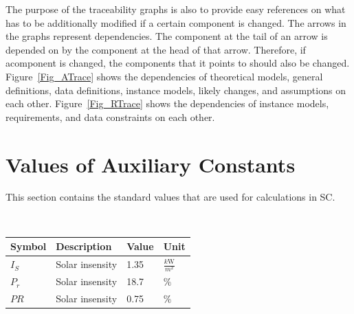 \documentclass[12pt]{article}
\begin{document}
The purpose of the traceability graphs is also to provide easy references on
what has to be additionally modified if a certain component is changed.  The
arrows in the graphs represent dependencies. The component at the tail of an
arrow is depended on by the component at the head of that arrow. Therefore, if
acomponent is changed, the components that it points to should also be
changed. Figure~\ref{Fig_ATrace} shows the dependencies of theoretical models,
general definitions, data definitions, instance models, likely changes, and
assumptions on each other.  Figure~\ref{Fig_RTrace} shows the dependencies of
instance models, requirements, and data constraints on each other.




\section{Values of Auxiliary Constants}\label{sec_VAC}



This section contains the standard values that are used for calculations in SC.


~\newline

\renewcommand{\arraystretch}{1.2}

  \noindent \begin{tabular}{l l l l} 
    \toprule		
    \textbf{Symbol} & \textbf{Description} & \textbf{Value}& \textbf{Unit}\\
    \midrule 
    $I_{S}$ & Solar insensity &1.35 & $\frac{k\si\watt}{m^2}$ \\
 	 $P_r$ & Solar insensity &18.7 & $\%$ \\
	 $PR$ & Solar insensity &0.75 & $\%$ \\
    \bottomrule
  \end{tabular}
\end{document}
